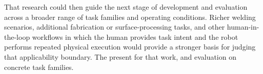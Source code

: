 That research could then guide the next stage of \DIFdelbegin {}\DIFdelend \DIFaddbegin {}\DIFaddend development and evaluation across a broader range of task families and operating conditions. Richer welding scenarios, additional fabrication or surface-processing tasks, and other human-in-the-loop workflows in which the human provides task intent and the robot performs repeated physical execution would provide a stronger basis for judging that applicability boundary. The present \DIFdelbegin {}\DIFdelend \DIFaddbegin {}\DIFaddend for that work, \DIFdelbegin {}\DIFdelend \DIFaddbegin {}\DIFaddend and evaluation on \DIFaddbegin {}\DIFaddend concrete task families.
